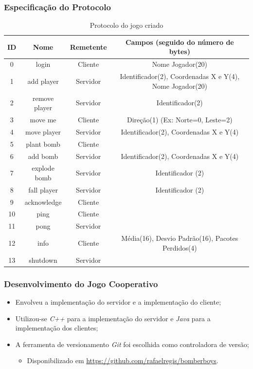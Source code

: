 \documentclass{beamer}
\begin{document}
\begin{frame} \frametitle{Especificação do Protocolo}
\begin{table}
  \center
  \tiny
  \begin{tabular}{|c|c|c|c|}
  \hline
    \textbf{ID} & \textbf{Nome} & \textbf{Remetente} & \textbf{Campos (seguido do número de bytes)} \\ \hline
    0 & login & Cliente & Nome Jogador(20)  \\ \hline
    1 & add player & Servidor & Identificador(2), Coordenadas X e Y(4), Nome Jogador(20)\\ \hline
    2 & remove player & Servidor & Identificador(2) \\ \hline
    3 & move me & Cliente & Direção(1) (Ex: Norte=0, Leste=2) \\ \hline
    4 & move player & Servidor & Identificador(2), Coordenadas X e Y(4) \\ \hline
    5 & plant bomb & Cliente & \\ \hline
    6 & add bomb & Servidor &  Identificador(2), Coordenadas X e Y(4)  \\ \hline
    7 & explode bomb & Servidor & Identificador (2) \\ \hline
    8 & fall player & Servidor & Identificador (2) \\ \hline
    9 & acknowledge & Cliente & \\ \hline
   10 & ping & Cliente & \\ \hline
   11 & pong & Servidor & \\ \hline
   12 & info & Cliente & Média(16), Desvio Padrão(16), Pacotes Perdidos(4)  \\ \hline
   13 & shutdown & Servidor &\\ \hline
  \end{tabular} 
\caption{Protocolo do jogo criado}
\label{tab:protocolo}
\end{table} 
\end{frame}

\begin{frame} \frametitle{Desenvolvimento do Jogo Cooperativo}
\begin{itemize}
	\item \justifying Envolveu a implementação do servidor e a implementação do cliente;
	\item \justifying Utilizou-se \emph{C++} \cite{CPP} para a implementação do servidor e \emph{Java} \cite{Java} para a implementação dos
clientes;
	\item \justifying A ferramenta de versionamento \emph{Git} \cite{Git} foi escolhida como controladora de versão;
	\begin{itemize}
		\item Disponibilizado em \url{https://github.com/rafaelregis/bomberboys}.
	\end{itemize}
\end{itemize}
\end{frame}
\end{document}
